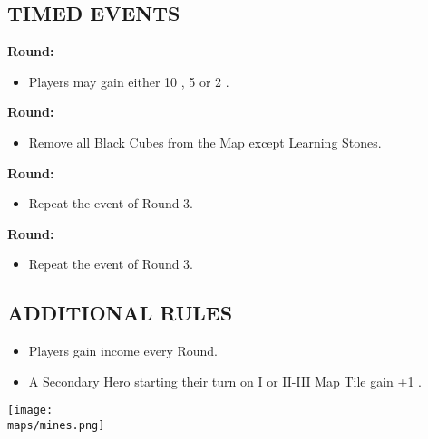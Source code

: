 \begin{multicols*}{2}
\subsection*{\MakeUppercase{Timed Events}}
\textbf{ Round:}
\begin{itemize}
  \item Players may gain either 10 , 5  or 2 .
\end{itemize}
\textbf{ Round:}
\begin{itemize}
  \item Remove all Black Cubes from the Map except Learning Stones.
\end{itemize}
\textbf{ Round:}
\begin{itemize}
  \item Repeat the event of Round 3.
\end{itemize}
\textbf{ Round:}
\begin{itemize}
  \item Repeat the event of Round 3.
\end{itemize}

\subsection*{\MakeUppercase{Additional Rules}}
\begin{itemize}
  \item Players gain income every Round.
  \item A Secondary Hero starting their turn on I or II-III Map Tile gain +1 .
\end{itemize}

\begin{center}
  \vfill
  \texttt{[image: \\maps/mines.png]}
  \vfill
\end{center}

\end{multicols*}
